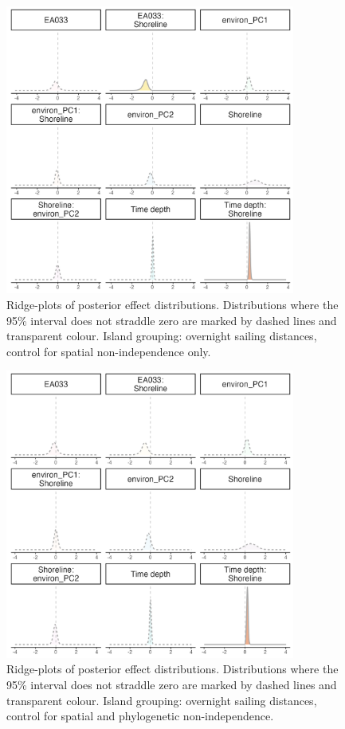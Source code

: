 \documentclass[unnumsec,webpdf,modern,medium]{oup-authoring-template}
\begin{document}
\begin{figure}[ht]
\includegraphics[width=0.85\textwidth]{brms_SBZR_control_spatial_group_full_effect_ridge_panels_plot.png}
\caption{Ridge-plots of posterior effect distributions. Distributions where the 95\% interval does not straddle zero are marked by dashed lines and transparent colour. Island grouping: overnight sailing distances, control for spatial non-independence only.}
\label{brms_SBZR_control_spatial_group_full_effect_ridge_panels_plot}
\end{figure}


\begin{figure}[ht]
\includegraphics[width=0.85\textwidth]{brms_SBZR_control_spatialphylo_group_full_effect_ridge_panels_plot.png}
\caption{Ridge-plots of posterior effect distributions. Distributions where the 95\% interval does not straddle zero are marked by dashed lines and transparent colour. Island grouping: overnight sailing distances, control for spatial and phylogenetic non-independence.}
\label{brms_SBZR_control_spatialphylo_group_full_effect_ridge_panels_plot}
\end{figure}
\end{document}
